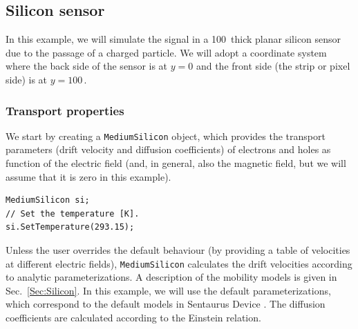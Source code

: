 \subsection{Silicon sensor}\label{Sec:ExampleSilicon}
In this example, we will simulate the signal in a 100\, thick 
planar silicon sensor due to the passage of a charged particle. 
We will adopt a coordinate system where the back side of the sensor is at 
$y = 0$ and the front side (\ie the strip or pixel side) is at $y = 100$\,.

\subsubsection{Transport properties}
We start by creating a \texttt{MediumSilicon} object, 
which provides the transport parameters (\eg drift velocity and 
diffusion coefficients) of electrons and holes as function 
of the electric field (and, in general, also the magnetic field, 
but we will assume that it is zero in this example).
\begin{lstlisting}
MediumSilicon si;
// Set the temperature [K].
si.SetTemperature(293.15);
\end{lstlisting}
Unless the user overrides the default behaviour 
(by providing a table of velocities at different electric fields), 
\texttt{MediumSilicon} calculates the drift velocities according to 
analytic parameterizations. 
A description of the mobility models is given in Sec.~\ref{Sec:Silicon}.
In this example, we will use the default parameterizations, 
which correspond to the default models in Sentaurus Device \cite{Synopsys}. 
The diffusion coefficients are calculated according to the Einstein relation.


